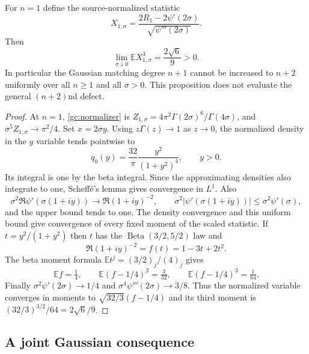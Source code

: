\begin{proposition}
\label{gc:sharpness}
For $n=1$ define the source-normalized statistic
\[
 X_{1,\sigma}=\frac{2R_1-2\psi'(2\sigma)}
                         {\sqrt{\psi'''(2\sigma)}}.
\]
Then
\begin{equation}\label{gc:skewlimit}
        \lim_{\sigma\downarrow0}\mathbb E X_{1,\sigma}^3
                       =\frac{2\sqrt6}{9}>0.
\end{equation}
In particular the Gaussian matching degree $n+1$ cannot be increased
to $n+2$ uniformly over all $n\ge1$ and all $\sigma>0$.
This proposition does not evaluate the general $(n+2)$nd defect.
\end{proposition}
\begin{proof}
At $n=1$, \eqref{gc:normalizer} is
$Z_{1,\sigma}=4\pi^2\Gamma(2\sigma)^6/\Gamma(4\sigma)$,
and $\sigma^5 Z_{1,\sigma}\to\pi^2/4$.
Set $x=2\sigma y$. Using $z\Gamma(z)\to1$ as $z\to0$, the
normalized density in the $y$ variable tends pointwise to
\[
                q_0(y)=\frac{32}{\pi}\frac{y^2}{(1+y^2)^4},
                \qquad y>0.
\]
Its integral is one by the beta integral. Since the approximating
densities also integrate to one, Scheff\'e's lemma gives convergence
in $L^1$. Also
\[
 \sigma^2\Re\psi'(\sigma(1+iy))
       \longrightarrow\Re(1+iy)^{-2},\qquad
 \sigma^2|\psi'(\sigma(1+iy))|
       \le\sigma^2\psi'(\sigma),
\]
and the upper bound tends to one. The density convergence and this
uniform bound give convergence of every fixed moment of the scaled
statistic. If $t=y^2/(1+y^2)$ then $t$ has the
$\operatorname{Beta}(3/2,5/2)$ law and
\[
 \Re(1+iy)^{-2}=f(t)=1-3t+2t^2.
\]
The beta moment formula
$\mathbb Et^j=(3/2)_j/(4)_j$ gives
\[
 \mathbb Ef=\tfrac14,\qquad
 \mathbb E(f-1/4)^2=\tfrac3{32},\qquad
 \mathbb E(f-1/4)^3=\tfrac1{64}.
\]
Finally $\sigma^2\psi'(2\sigma)\to1/4$ and
$\sigma^4\psi'''(2\sigma)\to3/8$. Thus the normalized variable
converges in moments to $\sqrt{32/3}(f-1/4)$ and its third moment
is $(32/3)^{3/2}/64=2\sqrt6/9$.
\end{proof}

\subsection{A joint Gaussian consequence}

